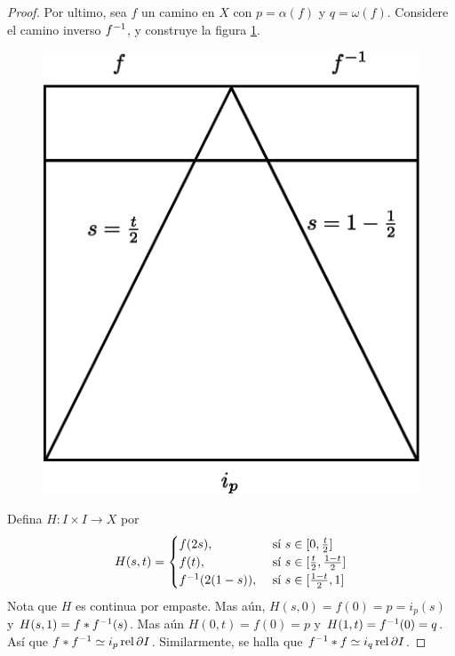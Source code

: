 \begin{proof}
     Por ultimo, sea $f$ un camino en $X$ con $p=\alpha(f)$ y $q=\omega(f)$.
     Considere el camino inverso $f^{-1}$, y construye la figura \ref{fig_24}.
     \begin{figure}[h]
         \centering
         \includegraphics[scale=0.5]{Figures/path_inverse.eps}
         \caption{}
         \label{fig_24}
     \end{figure}
    Defina $H:I \times I \xrightarrow{} X$ por
    \begin{equation*}
          H(s,t)=\begin{cases}
                      f(2s), & \text{ s\'i } s \in [0, \frac{t}{2}]  \\
                      f(t), & \text{ s\'i } s \in [\frac{t}{2}, \frac{1-t}{2}] \\
                      f^{-1}(2(1-s)), &  \text{ s\'i } s \in [\frac{1-t}{2},1]  \\
                 \end{cases}
    \end{equation*}
    Nota que $H$ es continua por empaste. Mas a\'un, $H(s,0)=f(0)=p=i_p(s)$ y
    $H(s,1)=f \ast f^{-1}(s)$. Mas a\'un $H(0,t)=f(0)=p$ y
    $H(1,t)=f^{-1}(0)=q$. As\'i que $f \ast f^{-1} \simeq i_p
    \operatorname{rel}{\partial{I}}$. Similarmente, se halla que $f^{-1} \ast f \simeq i_q
    \operatorname{rel}{\partial{I}}$.
\end{proof}

